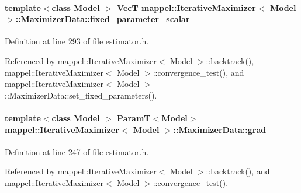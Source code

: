 \paragraph[{\texorpdfstring{fixed\+\_\+parameter\+\_\+scalar}{fixed_parameter_scalar}}]{\setlength{\rightskip}{0pt plus 5cm}template$<$class Model $>$ {\bf VecT} {\bf mappel\+::\+Iterative\+Maximizer}$<$ Model $>$\+::Maximizer\+Data\+::fixed\+\_\+parameter\+\_\+scalar}\hypertarget{classmappel_1_1IterativeMaximizer_1_1MaximizerData_af078e8d5506273857fd7c2ffad69f8da}{}\label{classmappel_1_1IterativeMaximizer_1_1MaximizerData_af078e8d5506273857fd7c2ffad69f8da}


Definition at line 293 of file estimator.\+h.



Referenced by mappel\+::\+Iterative\+Maximizer$<$ Model $>$\+::backtrack(), mappel\+::\+Iterative\+Maximizer$<$ Model $>$\+::convergence\+\_\+test(), and mappel\+::\+Iterative\+Maximizer$<$ Model $>$\+::\+Maximizer\+Data\+::set\+\_\+fixed\+\_\+parameters().

\paragraph[{\texorpdfstring{grad}{grad}}]{\setlength{\rightskip}{0pt plus 5cm}template$<$class Model $>$ {\bf ParamT}$<$Model$>$ {\bf mappel\+::\+Iterative\+Maximizer}$<$ Model $>$\+::Maximizer\+Data\+::grad}\hypertarget{classmappel_1_1IterativeMaximizer_1_1MaximizerData_a3125e5d8ae4e2d4c4969ccb0187903fb}{}\label{classmappel_1_1IterativeMaximizer_1_1MaximizerData_a3125e5d8ae4e2d4c4969ccb0187903fb}


Definition at line 247 of file estimator.\+h.



Referenced by mappel\+::\+Iterative\+Maximizer$<$ Model $>$\+::backtrack(), and mappel\+::\+Iterative\+Maximizer$<$ Model $>$\+::convergence\+\_\+test().

